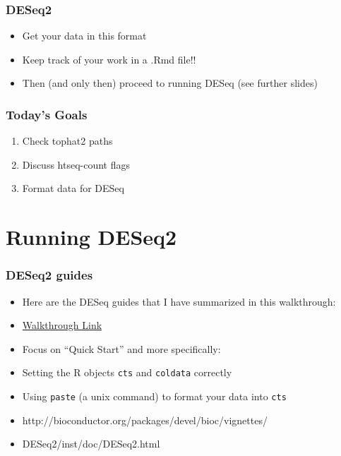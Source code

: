 \documentclass[14pt,handout]{beamer}
\begin{document}
\begin{frame}
\frametitle{DESeq2}
\begin{itemize}
	\item Get your data in this format
	\item Keep track of your work in a .Rmd file!!
	\item Then (and only then) proceed to running DESeq (see further slides)
\end{itemize}
\end{frame}

\begin{frame}
\frametitle{Today's Goals}
\large
\begin{enumerate}
	\item<+-> Check tophat2 paths
	\item<+-> Discuss htseq-count flags
	\item<+-> Format data for DESeq
\end{enumerate}
\end{frame}

\section{Running DESeq2}

\begin{frame}
\frametitle{DESeq2 guides}
\begin{itemize}
	\item Here are the DESeq guides that I have summarized in this walkthrough:
	\item \href{http://bioconductor.org/packages/devel/bioc/vignettes/DESeq2/inst/doc/DESeq2.html}{Walkthrough Link}
	\item Focus on ``Quick Start'' and more specifically:
	\item Setting the R objects \texttt{cts} and \texttt{coldata} correctly
	\item Using \texttt{paste} (a unix command) to format your data into \texttt{cts}
	\footnotesize
	\item[] http://bioconductor.org/packages/devel/bioc/vignettes/
	\item[] DESeq2/inst/doc/DESeq2.html
\end{itemize}
\end{frame}
\end{document}
